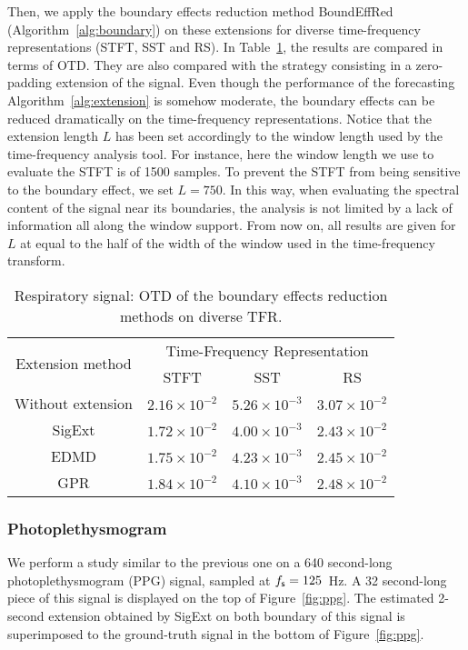 Then, we apply the boundary effects reduction method {\sf BoundEffRed} (Algorithm~\ref{alg:boundary}) on these extensions for diverse time-frequency representations (STFT, SST and RS). In Table~\ref{tab:otd.tho}, the results are compared in terms of OTD. They are also compared with the strategy consisting in a zero-padding extension of the signal. Even though the performance of the forecasting Algorithm~\ref{alg:extension} is somehow moderate, the boundary effects can be reduced dramatically on the time-frequency representations. Notice that the extension length $L$ has been set accordingly to the window length used by the time-frequency analysis tool. For instance, here the window length we use to evaluate the STFT is of 1500 samples. To prevent the STFT from being sensitive to the boundary effect, we set $L=750$. In this way, when evaluating the spectral content of the signal near its boundaries, the analysis is not limited by a lack of information all along the window support. From now on, all results are given for $L$ at equal to the half of the width of the window used in the time-frequency transform.  

\begin{table}
\centering
\caption{Respiratory signal: OTD of the boundary effects reduction methods on diverse TFR.}
\begin{tabular}{|c||c|c|c|}
  \hline
   \multirow{2}{*}{Extension method} & \multicolumn{3}{c|}{Time-Frequency Representation} \\
   \cline{2-4}
      & STFT & SST & RS\\
   \hhline{|=#=|=|=|}
   Without extension & $2.16\times 10^{-2}$ & $5.26\times 10^{-3}$ & $3.07\times 10^{-2}$ \\
   \hline
   {\sf SigExt} & $1.72\times 10^{-2}$ & $4.00\times 10^{-3}$ & $2.43\times 10^{-2}$ \\
   \hline
   EDMD & $1.75\times 10^{-2}$ & $4.23\times 10^{-3}$ & $2.45\times 10^{-2}$ \\
   \hline
   GPR & $1.84\times 10^{-2}$ & $4.10\times 10^{-3}$ & $2.48\times 10^{-2}$ \\
   \hline
\end{tabular}
\label{tab:otd.tho}
\end{table}


\subsubsection{Photoplethysmogram}
\label{ssse:ppg}
We perform a study similar to the previous one on a 640 second-long photoplethysmogram (PPG) signal, sampled at $f_{\mathsf s}=125$~Hz. A 32 second-long piece of this signal is displayed on the top of Figure~\ref{fig:ppg}. The estimated 2-second extension obtained by {\sf SigExt} on both boundary of this signal is superimposed to the ground-truth signal in the bottom of Figure~\ref{fig:ppg}.


